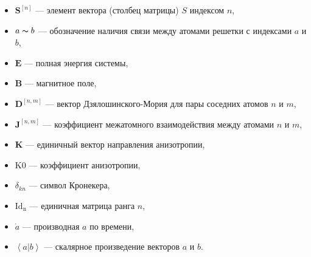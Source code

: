 \newcommand*{\heff}{\ensuremath{\mathcal{H}}}
\newcommand*{\Sn}{\ensuremath{\mathbf{S}^{[n]}}}

\begin{itemize}
    \item $\Sn$ --- элемент вектора (столбец матрицы) $S$
        индексом $n$,
    \item $a \thicksim b$ --- обозначение наличия связи между атомами решетки с
        индексами $a$ и $b$,
    \item $\mathbf{E} $ --- полная энергия системы,
    \item $\mathbf{B} $ --- магнитное поле,
    \item $\mathbf{D}^{[n,m]} $ --- вектор Дзялошинского-Мория для пары
        соседних атомов $n$ и $m$,
    \item $\mathbf{J}^{[n,m]} $ --- коэффициент межатомного взаимодействия
        между атомами $n$ и $m$,
    \item $\mathbf{K} $ --- единичный вектор направления анизотропии,
    \item $\mathrm{K0} $ --- коэффициент анизотропии,
    \item $\delta_{kn} $ --- символ Кронекера,
    \item $\mathrm{Id_n} $ --- единичная матрица ранга $n$,
    \item $\dot a $ --- производная $a$ по времени,
    \item $\left<a | b\right> $ --- скалярное произведение векторов $a$ и $b$.
\end{itemize}
\newpage
